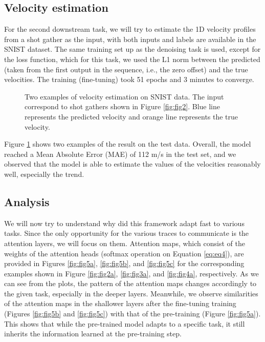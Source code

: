 \documentclass{article}
\begin{document}
\subsection{Velocity estimation}
For the second downstream task, we will try to estimate the 1D velocity profiles from a shot gather as the input, with both inputs and labels are available in the SNIST dataset. The same training set up as the denoising task is used, except for the loss function, which for this task, we used the L1 norm between the predicted (taken from the first output in the sequence, i.e., the zero offset) and the true velocities. The training (fine-tuning) took 51 epochs and 3 minutes to converge.

\begin{figure}[h]
    \centering
    \caption{Two examples of velocity estimation on SNIST data. The input correspond to shot gathers shown in Figure \ref{fig:fig2}. Blue line represents the predicted velocity and orange line represents the true velocity.}
    \label{fig:fig4}
\end{figure}

Figure \ref{fig:fig4} shows two examples of the result on the test data. Overall, the model reached a Mean Absolute Error (MAE) of 112 m/s in the test set, and we observed that the model is able to estimate the values of the velocities reasonably well, especially the trend.

\subsection{Analysis}
\label{sec:analysis}
We will now try to understand why did this framework adapt fast to various tasks. Since the only opportunity for the various traces to communicate is the attention layers, we will focus on them. Attention maps, which consist of the weights of the attention heads (softmax operation on Equation \ref{eq:eq4}), are provided in Figures \ref{fig:fig5a}, \ref{fig:fig5b}, and \ref{fig:fig5c} for the corresponding examples shown in Figure \ref{fig:fig2a}, \ref{fig:fig3a}, and \ref{fig:fig4a}, respectively. As we can see from the plots, the pattern of the attention maps changes accordingly to the given task, especially in the deeper layers. Meanwhile, we observe similarities of the attention maps in the shallower layers after the fine-tuning training (Figures \ref{fig:fig5b} and \ref{fig:fig5c}) with that of the pre-training (Figure \ref{fig:fig5a}). This shows that while the pre-trained model adapts to a specific task, it still inherits the information learned at the pre-training step. 
\end{document}
